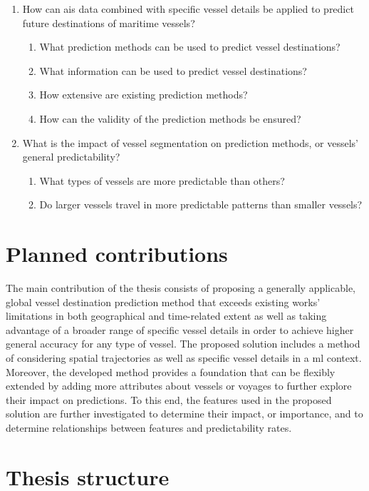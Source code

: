 \begin{enumerate}
    \item How can \acrshort{ais} data combined with specific vessel details be applied to predict future destinations of maritime vessels?
    \begin{enumerate}
    \item What prediction methods can be used to predict vessel destinations?
    \item What information can be used to predict vessel destinations?
    \item How extensive are existing prediction methods?
    \item How can the validity of the prediction methods be ensured?
    \end{enumerate}
    \item What is the impact of vessel segmentation on prediction methods, or vessels' general predictability?
    \begin{enumerate}
    \item What types of vessels are more predictable than others?
    \item Do larger vessels travel in more predictable patterns than smaller vessels?
    \end{enumerate}
\end{enumerate}

\section{Planned contributions}

The main contribution of the thesis consists of proposing a generally applicable, global vessel destination prediction method that exceeds existing works' limitations in both geographical and time-related extent as well as taking advantage of a broader range of specific vessel details in order to achieve higher general accuracy for any type of vessel. The proposed solution includes a method of considering spatial trajectories as well as specific vessel details in a \acrfull{ml} context. Moreover, the developed method provides a foundation that can be flexibly extended by adding more attributes about vessels or voyages to further explore their impact on predictions. To this end, the features used in the proposed solution are further investigated to determine their impact, or importance, and to determine relationships between features and predictability rates.

\section{Thesis structure}

